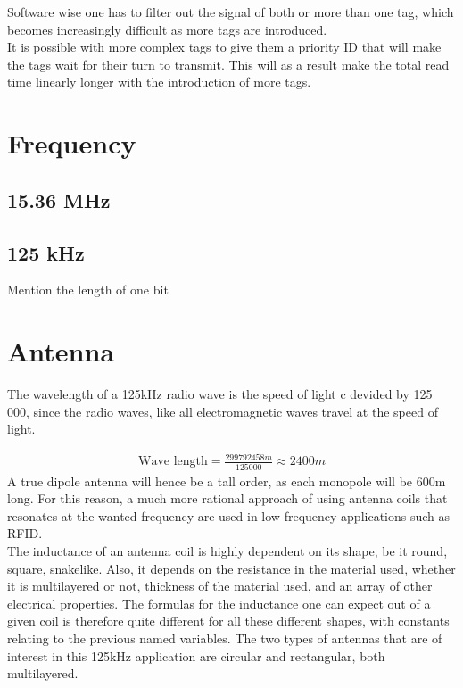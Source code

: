 Software wise one has to filter out the signal of both or more than one tag, which becomes increasingly difficult as more tags are introduced.\\

It is possible with more complex tags to give them a priority ID that will make the tags wait for their turn to transmit. This will as a result make the total read time linearly longer with the introduction of more tags. \\



\section{Frequency}
\subsection{15.36 MHz}
\subsection{125 kHz}
Mention the length of one bit





\section{Antenna}
The wavelength of a 125kHz radio wave is the speed of light c devided by 125 000, since the radio waves, like all electromagnetic waves travel at the speed of light.

\begin{align*}
    \text{Wave length} = \frac{299 792 458m}{125000}\approx 2400 m
\end{align*}
A true dipole antenna will hence be a tall order, as each monopole will be 600m long. For this reason, a much more rational approach of using antenna coils that resonates at the wanted frequency are used in low frequency applications such as RFID.\\

The inductance of an antenna coil is highly dependent on its shape, be it round, square, snakelike. Also, it depends on the resistance in the material used, whether it is multilayered or not, thickness of the material used, and an array of other electrical properties. The formulas for the inductance one can expect out of a given coil is therefore quite different for all these different shapes, with constants relating to the previous named variables. \cite{antennadesign} The two types of antennas that are of interest in this 125kHz application are circular and rectangular, both multilayered.\\




